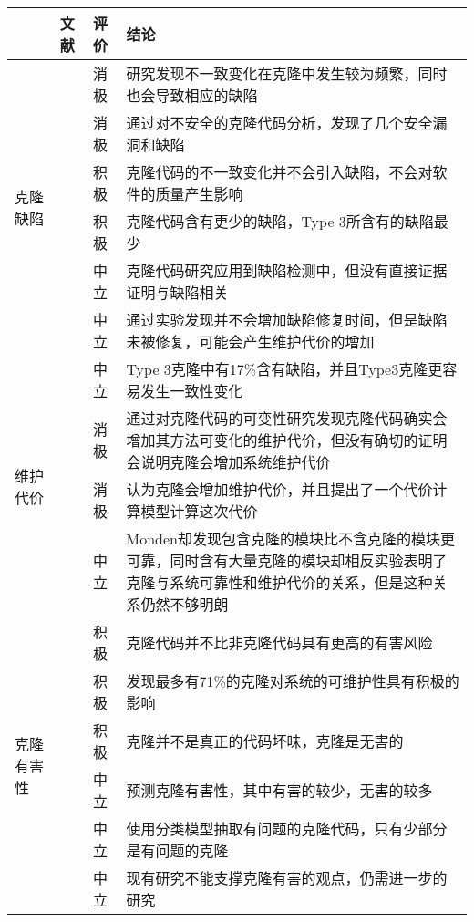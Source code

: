 \begin{table}[htbp]
\centering
{}\vspace{0.5em}\wuhao
\begin{tabularx}{0.9\textwidth}{lllX}
\toprule[1.5pt]
&文献&评价&结论\\
\midrule[1pt]
\multirow{6}{*}{{克隆缺陷}} 
&\cite{juergens2009code}&消极&研究发现不一致变化在克隆中发生较为频繁，同时也会导致相应的缺陷\\
&\cite{gauthier2013uncovering}&消极&通过对不安全的克隆代码分析，发现了几个安全漏洞和缺陷\\
&\cite{bettenburg2009empirical}&积极&克隆代码的不一致变化并不会引入缺陷，不会对软件的质量产生影响\\
&\cite{elish2015fault}&积极&克隆代码含有更少的缺陷，Type 3所含有的缺陷最少\\
&\cite{lo2012active}&中立&克隆代码研究应用到缺陷检测中，但没有直接证据证明与缺陷相关\\
&\cite{kamei2011empirical}&中立	&通过实验发现并不会增加缺陷修复时间，但是缺陷未被修复，可能会产生维护代价的增加\\
\midrule[1pt]
\multirow{4}{*}{{维护代价}} 
&\cite{wagner2016relationship}&中立	&Type 3克隆中有17\%含有缺陷，并且Type3克隆更容易发生一致性变化\\
&\cite{harder2012controlled}&消极&通过对克隆代码的可变性研究发现克隆代码确实会增加其方法可变化的维护代价，但没有确切的证明会说明克隆会增加系统维护代价\\
&\cite{juergens2010much}&消极&认为克隆会增加维护代价，并且提出了一个代价计算模型计算这次代价\\
&\cite{monden2002software}&中立&Monden却发现包含克隆的模块比不含克隆的模块更可靠，同时含有大量克隆的模块却相反实验表明了克隆与系统可靠性和维护代价的关系，但是这种关系仍然不够明朗\\
\midrule[1pt]
\multirow{6}{*}{{克隆有害性}} 
&\cite{selim2010studying}&积极&克隆代码并不比非克隆代码具有更高的有害风险\\
&\cite{kapser2006cloning}\cite{kapser2008cloning}&积极	&发现最多有71\%的克隆对系统的可维护性具有积极的影响\\
&\cite{rahman2012clones}&积极	&克隆并不是真正的代码坏味，克隆是无害的\\
&\cite{wang2012can}&中立	&预测克隆有害性，其中有害的较少，无害的较多\\
&\cite{higo2009problematic}&中立&使用分类模型抽取有问题的克隆代码，只有少部分是有问题的克隆\\
&\cite{hordijk2009harmfulness}&中立&现有研究不能支撑克隆有害的观点，仍需进一步的研究\\
\bottomrule[1.5pt]
\end{tabularx}
\end{table}

